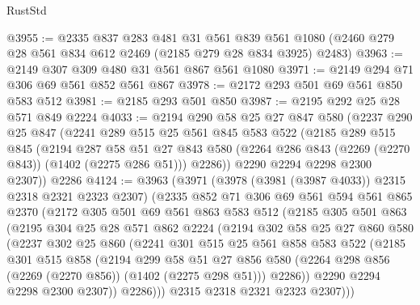\begin{lexlean}{RustStd}
\begin{coremodule}
@3955 := @2335
    @837
    @283
    @481
    @31
    @561
    @839
    @561
    @1080
    (@2460 @279 @28 @561 @834 @612 @2469 (@2185 @279 @28 @834 @3925) @2483)
@3963 := @2149 @307 @309 @480 @31 @561 @867 @561 @1080
@3971 := @2149 @294 @71 @306 @69 @561 @852 @561 @867
@3978 := @2172 @293 @501 @69 @561 @850 @583 @512
@3981 := @2185 @293 @501 @850
@3987 := @2195 @292 @25 @28 @571 @849 @2224
@4033 := @2194
    @290
    @58
    @25
    @27
    @847
    @580
    (@2237
      @290
      @25
      @847
      (@2241
        @289
        @515
        @25
        @561
        @845
        @583
        @522
        (@2185
          @289
          @515
          @845
          (@2194
            @287
            @58
            @51
            @27
            @843
            @580
            (@2264 @286 @843 (@2269 (@2270 @843)) (@1402 (@2275 @286 @51)))
            @2286))
        @2290
        @2294
        @2298
        @2300
        @2307))
    @2286
@4124 := @3963
    (@3971
      (@3978 (@3981 (@3987 @4033)) @2315 @2318 @2321 @2323 @2307)
      (@2335
        @852
        @71
        @306
        @69
        @561
        @594
        @561
        @865
        @2370
        (@2172
          @305
          @501
          @69
          @561
          @863
          @583
          @512
          (@2185
            @305
            @501
            @863
            (@2195
              @304
              @25
              @28
              @571
              @862
              @2224
              (@2194
                @302
                @58
                @25
                @27
                @860
                @580
                (@2237
                  @302
                  @25
                  @860
                  (@2241
                    @301
                    @515
                    @25
                    @561
                    @858
                    @583
                    @522
                    (@2185
                      @301
                      @515
                      @858
                      (@2194
                        @299
                        @58
                        @51
                        @27
                        @856
                        @580
                        (@2264 @298 @856 (@2269 (@2270 @856)) (@1402 (@2275 @298 @51)))
                        @2286))
                    @2290
                    @2294
                    @2298
                    @2300
                    @2307))
                @2286)))
          @2315
          @2318
          @2321
          @2323
          @2307)))

\end{coremodule}
\end{lexlean}
